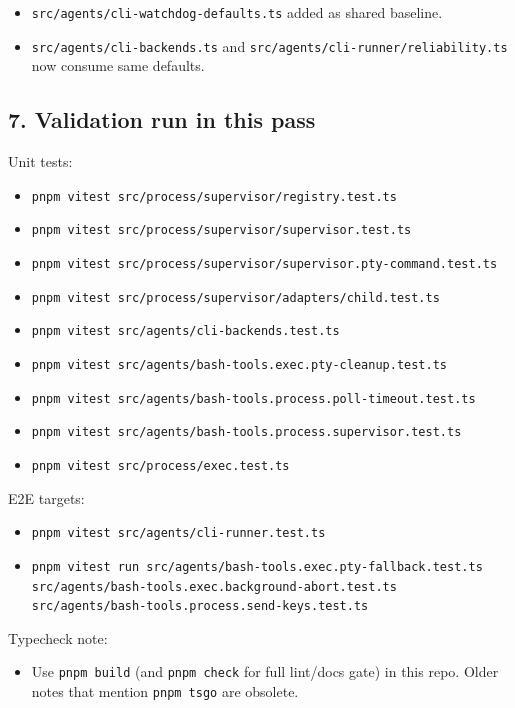\begin{itemize}
  \item \texttt{src/agents/cli-watchdog-defaults.ts} added as shared baseline.
  \item \texttt{src/agents/cli-backends.ts} and \texttt{src/agents/cli-runner/reliability.ts} now consume same defaults.
\end{itemize}


\subsection{7. Validation run in this pass}


Unit tests:

\begin{itemize}
  \item \texttt{pnpm vitest src/process/supervisor/registry.test.ts}
  \item \texttt{pnpm vitest src/process/supervisor/supervisor.test.ts}
  \item \texttt{pnpm vitest src/process/supervisor/supervisor.pty-command.test.ts}
  \item \texttt{pnpm vitest src/process/supervisor/adapters/child.test.ts}
  \item \texttt{pnpm vitest src/agents/cli-backends.test.ts}
  \item \texttt{pnpm vitest src/agents/bash-tools.exec.pty-cleanup.test.ts}
  \item \texttt{pnpm vitest src/agents/bash-tools.process.poll-timeout.test.ts}
  \item \texttt{pnpm vitest src/agents/bash-tools.process.supervisor.test.ts}
  \item \texttt{pnpm vitest src/process/exec.test.ts}
\end{itemize}


E2E targets:

\begin{itemize}
  \item \texttt{pnpm vitest src/agents/cli-runner.test.ts}
  \item \texttt{pnpm vitest run src/agents/bash-tools.exec.pty-fallback.test.ts src/agents/bash-tools.exec.background-abort.test.ts src/agents/bash-tools.process.send-keys.test.ts}
\end{itemize}


Typecheck note:

\begin{itemize}
  \item Use \texttt{pnpm build} (and \texttt{pnpm check} for full lint/docs gate) in this repo. Older notes that mention \texttt{pnpm tsgo} are obsolete.
\end{itemize}


